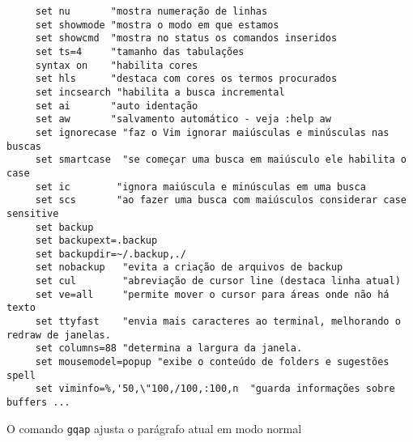 \begin{verbatim}
     set nu       "mostra numeração de linhas
     set showmode "mostra o modo em que estamos
     set showcmd  "mostra no status os comandos inseridos
     set ts=4     "tamanho das tabulações
     syntax on    "habilita cores
     set hls      "destaca com cores os termos procurados
     set incsearch "habilita a busca incremental
     set ai       "auto identação
     set aw       "salvamento automático - veja :help aw
     set ignorecase "faz o Vim ignorar maiúsculas e minúsculas nas buscas
     set smartcase  "se começar uma busca em maiúsculo ele habilita o case
     set ic        "ignora maiúscula e minúsculas em uma busca
     set scs       "ao fazer uma busca com maiúsculos considerar case sensitive
     set backup
     set backupext=.backup
     set backupdir=~/.backup,./
     set nobackup   "evita a criação de arquivos de backup
     set cul        "abreviação de cursor line (destaca linha atual)
     set ve=all     "permite mover o cursor para áreas onde não há texto
     set ttyfast    "envia mais caracteres ao terminal, melhorando o redraw de janelas.
     set columns=88 "determina a largura da janela.
     set mousemodel=popup "exibe o conteúdo de folders e sugestões spell
     set viminfo=%,'50,\"100,/100,:100,n  "guarda informações sobre buffers ...
\end{verbatim}

O comando \verb|gqap| ajusta o parágrafo atual em modo normal

